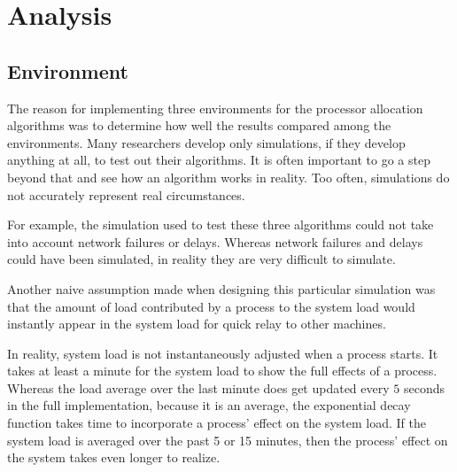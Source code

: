 \documentclass{report}
\begin{document}





\section{Analysis}

\subsection{Environment}

The reason for implementing three environments for the processor allocation
algorithms was to determine how well the results compared among the
environments.  Many researchers develop only simulations, if they develop
anything at all, to test out their algorithms.  It is often important to go
a step beyond that and see how an algorithm works in reality.  Too often,
simulations do not accurately represent real circumstances.

For example, the simulation used to test these three algorithms could not
take into account network failures or delays.  Whereas network failures and
delays could have been simulated, in reality they are very difficult to
simulate.  

Another naive assumption made when designing this particular simulation was
that the amount of load contributed by a process to the system load would
instantly appear in the system load for quick relay to other machines.

In reality, system load is not instantaneously adjusted when a process
starts.  It takes at least a minute for the system load to show the full
effects of a process.  Whereas the load average over the last minute does
get updated every $5$ seconds in the full implementation, because it is an
average, the exponential decay function takes time to incorporate a process'
effect on the system load.  If the system load is averaged over the past 5
or 15 minutes, then the process' effect on the system takes even longer to
realize.
\end{document}
